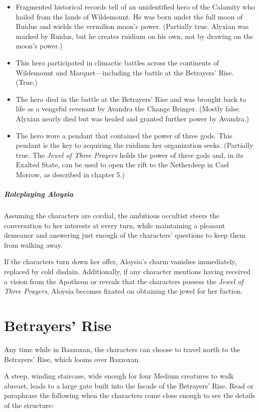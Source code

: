 \documentclass[10pt,a4paper,twoside,fancy,bg=print,twocolumn,openany,nodeprecatedcode]{dndbook}
\begin{document}
\begin{itemize}
\item Fragmented historical records tell of an unidentified hero of the Calamity who hailed from the lands of Wildemount. He was born under the full moon of Ruidus and wields the vermilion moon's power. (Partially true. Alyxian was marked by Ruidus, but he creates ruidium on his own, not by drawing on the moon's power.)
\item This hero participated in climactic battles across the continents of Wildemount and Marquet—including the battle at the Betrayers' Rise. (True.)
\item The hero died in the battle at the Betrayers' Rise and was brought back to life as a vengeful revenant by Avandra the Change Bringer. (Mostly false. Alyxian nearly died but was healed and granted further power by Avandra.)
\item The hero wore a pendant that contained the power of three gods. This pendant is the key to acquiring the ruidium her organization seeks. (Partially true. The \textit{Jewel of Three Prayers} holds the power of three gods and, in its Exalted State, can be used to open the rift to the Netherdeep in Cael Morrow, as described in chapter 5.)
\end{itemize}

\subparagraph{Roleplaying Aloysia}
Assuming the characters are cordial, the ambitious occultist steers the conversation to her interests at every turn, while maintaining a pleasant demeanor and answering just enough of the characters' questions to keep them from walking away.

If the characters turn down her offer, Aloysia's charm vanishes immediately, replaced by cold disdain. Additionally, if any character mentions having received a vision from the Apotheon or reveals that the characters possess the \textit{Jewel of Three Prayers}, Aloysia becomes fixated on obtaining the jewel for her faction.

\section{Betrayers' Rise}
Any time while in Bazzoxan, the characters can choose to travel north to the Betrayers' Rise, which looms over Bazzoxan.

A steep, winding staircase, wide enough for four Medium creatures to walk abreast, leads to a large gate built into the facade of the Betrayers' Rise. Read or paraphrase the following when the characters come close enough to see the details of the structure:
\end{document}
